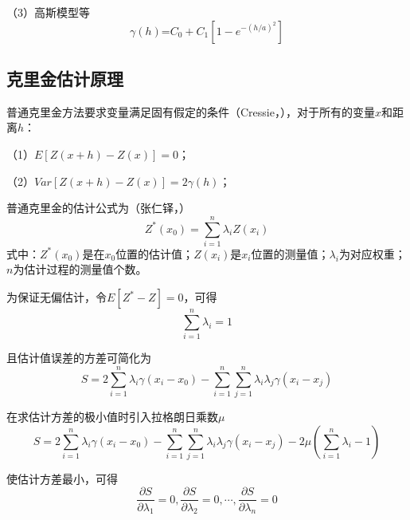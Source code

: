 （3）高斯模型等
\begin{equation}
    \gamma (h)\text{=}{{C}_{0}}+{{C}_{1}}\left[ 1-{{e}^{-{{(h/a)}^{2}}}} \right]
\end{equation}

\subsection{克里金估计原理}

普通克里金方法要求变量满足固有假定的条件（Cressie，\citeyear{cressie1988spatial}），对于所有的变量$x$和距离$h$：

（1）$E\left[ Z(x+h)-Z(x) \right]=0$；

（2）$Var\left[ Z(x+h)-Z(x) \right]=2\gamma (h)$；

普通克里金的估计公式为（张仁铎，\citeyear{张仁铎2005空间变异理论及应用}）
\begin{equation}
    {{Z}^{*}}({{x}_{0}})=\sum\limits_{i=1}^{n}{{{\lambda }_{i}}Z({{x}_{i}})}
\end{equation}
式中：${Z}^{*}(x_0)$是在$x_0$位置的估计值；$Z(x_i)$是$x_i$位置的测量值；${\lambda }_{i}$为对应权重；$n$为估计过程的测量值个数。

为保证无偏估计，令$E\left[ {{Z}^{*}}-Z \right]=0$，可得
\begin{equation}
    \sum\limits_{i=1}^{n}{{{\lambda }_{i}}=1}
\end{equation}

且估计值误差的方差可简化为
\begin{equation}
    S=2\sum\limits_{i=1}^{n}{{{\lambda }_{i}}\gamma ({{x}_{i}}-{{x}_{0}})-\sum\limits_{i=1}^{n}{\sum\limits_{j=1}^{n}{{{\lambda }_{i}}{{\lambda }_{j}}\gamma ({{x}_{i}}-{{x}_{j}})}}}
\end{equation}

在求估计方差的极小值时引入拉格朗日乘数$\mu $
\begin{equation}
    S=2\sum\limits_{i=1}^{n}{{{\lambda }_{i}}\gamma ({{x}_{i}}-{{x}_{0}})-\sum\limits_{i=1}^{n}{\sum\limits_{j=1}^{n}{{{\lambda }_{i}}{{\lambda }_{j}}\gamma ({{x}_{i}}-{{x}_{j}})}}}-2\mu (\sum\limits_{i=1}^{n}{{{\lambda }_{i}}-1})
\end{equation}

使估计方差最小，可得
\begin{equation}
    \label{equ:kriging}
    \frac{\partial S}{\partial {{\lambda }_{1}}}=0,\frac{\partial S}{\partial {{\lambda }_{2}}}=0,\cdots ,\frac{\partial S}{\partial {{\lambda }_{n}}}=0
\end{equation}

